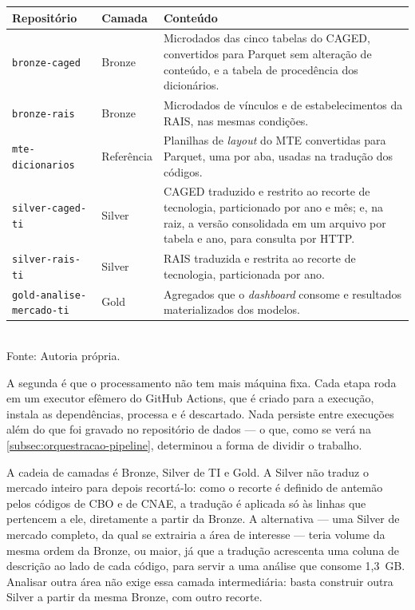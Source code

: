 \begin{quadro}[htbp]
    \centering
    \caption{Conjuntos de dados que compõem o \textit{data lake}}
    \label{quadro:repositorios}
    \footnotesize
    \renewcommand{\arraystretch}{1.3}
    \begin{tabularx}{\textwidth}{%
        >{\raggedright\arraybackslash\hsize=0.95\hsize}X
        >{\raggedright\arraybackslash\hsize=0.45\hsize}X
        >{\raggedright\arraybackslash\hsize=1.60\hsize}X}
        \toprule
        \rowcolor{black!8}
        \textbf{Repositório} & \textbf{Camada} & \textbf{Conteúdo} \\
        \midrule
        \texttt{bronze-caged} & Bronze & Microdados das cinco tabelas do CAGED, convertidos para Parquet sem alteração de conteúdo, e a tabela de procedência dos dicionários. \\
        \texttt{bronze-rais} & Bronze & Microdados de vínculos e de estabelecimentos da RAIS, nas mesmas condições. \\
        \texttt{mte-dicionarios} & Referência & Planilhas de \textit{layout} do MTE convertidas para Parquet, uma por aba, usadas na tradução dos códigos. \\
        \texttt{silver-caged-ti} & Silver & CAGED traduzido e restrito ao recorte de tecnologia, particionado por ano e mês; e, na raiz, a versão consolidada em um arquivo por tabela e ano, para consulta por HTTP. \\
        \texttt{silver-rais-ti} & Silver & RAIS traduzida e restrita ao recorte de tecnologia, particionada por ano. \\
        \texttt{gold-analise-mercado-ti} & Gold & Agregados que o \textit{dashboard} consome e resultados materializados dos modelos. \\
        \bottomrule
    \end{tabularx}
    \\[4pt]
    Fonte: Autoria própria.
\end{quadro}

A segunda é que o processamento não tem mais máquina fixa. Cada etapa roda em um executor efêmero do GitHub Actions, que é criado para a execução, instala as dependências, processa e é descartado. Nada persiste entre execuções além do que foi gravado no repositório de dados --- o que, como se verá na \autoref{subsec:orquestracao-pipeline}, determinou a forma de dividir o trabalho.

A cadeia de camadas é Bronze, Silver de TI e Gold. A Silver não traduz o mercado inteiro para depois recortá-lo: como o recorte é definido de antemão pelos códigos de CBO e de CNAE, a tradução é aplicada só às linhas que pertencem a ele, diretamente a partir da Bronze. A alternativa --- uma Silver de mercado completo, da qual se extrairia a área de interesse --- teria volume da mesma ordem da Bronze, ou maior, já que a tradução acrescenta uma coluna de descrição ao lado de cada código, para servir a uma análise que consome 1,3~GB. Analisar outra área não exige essa camada intermediária: basta construir outra Silver a partir da mesma Bronze, com outro recorte.

